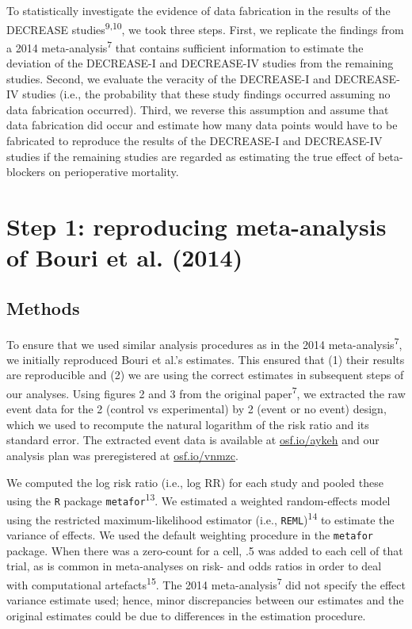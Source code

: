 \documentclass[]{article}
\begin{document}
To statistically investigate the evidence of data fabrication in the
results of the DECREASE studies\textsuperscript{9,10}, we took three
steps. First, we replicate the findings from a 2014
meta-analysis\textsuperscript{7} that contains sufficient information to
estimate the deviation of the DECREASE-I and DECREASE-IV studies from
the remaining studies. Second, we evaluate the veracity of the
DECREASE-I and DECREASE-IV studies (i.e., the probability that these
study findings occurred assuming no data fabrication occurred). Third,
we reverse this assumption and assume that data fabrication did occur
and estimate how many data points would have to be fabricated to
reproduce the results of the DECREASE-I and DECREASE-IV studies if the
remaining studies are regarded as estimating the true effect of
beta-blockers on perioperative mortality.

\section{Step 1: reproducing meta-analysis of Bouri et al.
(2014)}\label{step-1-reproducing-meta-analysis-of-bouri-et-al.-2014}

\subsection{Methods}\label{methods}

To ensure that we used similar analysis procedures as in the 2014
meta-analysis\textsuperscript{7}, we initially reproduced Bouri et al.'s
estimates. This ensured that (1) their results are reproducible and (2)
we are using the correct estimates in subsequent steps of our analyses.
Using figures 2 and 3 from the original paper\textsuperscript{7}, we
extracted the raw event data for the 2 (control vs experimental) by 2
(event or no event) design, which we used to recompute the natural
logarithm of the risk ratio and its standard error. The extracted event
data is available at \href{https://osf.io/aykeh}{osf.io/aykeh} and our
analysis plan was preregistered at
\href{https://osf.io/vnmzc}{osf.io/vnmzc}.

We computed the log risk ratio (i.e., log RR) for each study and pooled
these using the \texttt{R} package \texttt{metafor}\textsuperscript{13}.
We estimated a weighted random-effects model using the restricted
maximum-likelihood estimator (i.e., \texttt{REML})\textsuperscript{14}
to estimate the variance of effects. We used the default weighting
procedure in the \texttt{metafor} package. When there was a zero-count
for a cell, .5 was added to each cell of that trial, as is common in
meta-analyses on risk- and odds ratios in order to deal with
computational artefacts\textsuperscript{15}. The 2014
meta-analysis\textsuperscript{7} did not specify the effect variance
estimate used; hence, minor discrepancies between our estimates and the
original estimates could be due to differences in the estimation
procedure.
\end{document}
